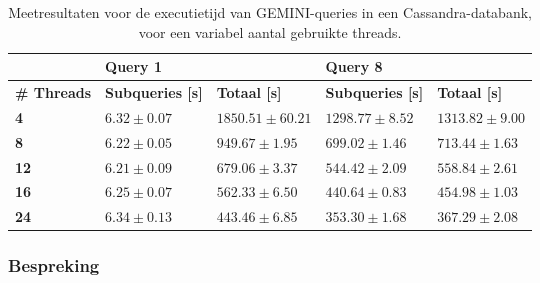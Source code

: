 \begin{table}[!h]
\centering
\begin{tabular}{@{}lllll@{}}
\cmidrule(l){2-5}
                                       & \multicolumn{2}{|l|}{\textbf{Query 1}}                                                      & \multicolumn{2}{l|}{\textbf{Query 8}}                             \\ 
\midrule
\multicolumn{1}{|l|}{\textbf{\# Threads}}  & \multicolumn{1}{l|}{\textbf{Subqueries [s]}}               & \multicolumn{1}{l|}{\textbf{Totaal [s]}} & \multicolumn{1}{l|}{\textbf{Subqueries [s]}} & \multicolumn{1}{l|}{\textbf{Totaal [s]}} \\ \midrule
\multicolumn{1}{|l|}{\textbf{4}} & \multicolumn{1}{l|}{$6.32 \pm 0.07$} & \multicolumn{1}{l|}{$1850.51 \pm 60.21$}             & \multicolumn{1}{l|}{$1298.77 \pm 8.52$}          & \multicolumn{1}{l|}{$1313.82 \pm 9.00$}                        \\
\multicolumn{1}{|l|}{\textbf{8}} & \multicolumn{1}{l|}{$6.22 \pm 0.05$} &\multicolumn{1}{l|}{$949.67 \pm 1.95$}            & \multicolumn{1}{l|}{$699.02 \pm 1.46$}          & \multicolumn{1}{l|}{$713.44 \pm 1.63$}                        \\
\multicolumn{1}{|l|}{\textbf{12}} & \multicolumn{1}{l|}{$6.21 \pm 0.09$} &\multicolumn{1}{l|}{$679.06 \pm 3.37$}            & \multicolumn{1}{l|}{$544.42 \pm 2.09$}           & \multicolumn{1}{l|}{$558.84 \pm 2.61$}                        \\
\multicolumn{1}{|l|}{\textbf{16}} & \multicolumn{1}{l|}{$6.25 \pm 0.07$} &\multicolumn{1}{l|}{$562.33 \pm 6.50$}                 & \multicolumn{1}{l|}{$440.64 \pm 0.83$}                    & \multicolumn{1}{l|}{$454.98 \pm 1.03$}                        \\
\multicolumn{1}{|l|}{\textbf{24}} & \multicolumn{1}{l|}{$6.34 \pm 0.13$} &\multicolumn{1}{l|}{$443.46 \pm 6.85$}          & \multicolumn{1}{l|}{$353.30 \pm 1.68$}           & \multicolumn{1}{l|}{$367.29 \pm 2.08$}                        \\
\bottomrule
\end{tabular}
\caption{Meetresultaten voor de executietijd van GEMINI-queries in een Cassandra-databank, voor een variabel aantal gebruikte threads.}
\end{table}

\subsubsection{Bespreking}

